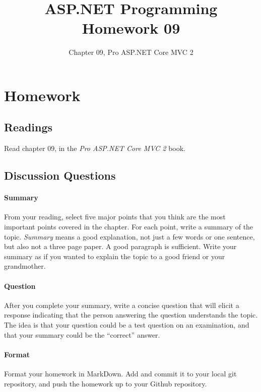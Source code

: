 \documentclass{article}
\title{ASP.NET Programming Homework 09}
\author{Chapter 09, Pro ASP.NET Core MVC 2}
\date{}
\begin{document}
    

    \maketitle{}
    \thispagestyle{fancy}

    \section*{Homework}

        \subsection*{Readings}

        Read chapter 09, in the \textit{Pro ASP.NET Core MVC 2} book.
        
        \subsection*{Discussion Questions}

        \paragraph{Summary} From your reading, select five major points that you think are the most important points covered in the chapter. For each point, write a summary of the topic. \textit{Summary} means a good explanation, not just a few words or one sentence, but also not a three page paper. A good paragraph is sufficient. Write your summary as if you wanted to explain the topic to a good friend or your grandmother. 

        \paragraph{Question} After you complete your summary, write a concise question that will elicit a response indicating that the person answering the question understands the topic. The idea is that your question could be a test question on an examination, and that your summary could be the ``correct'' answer.

        \paragraph{Format} Format your homework in MarkDown. Add and commit it to your local git repository, and push the homework up to your Github repository.
\end{document}
